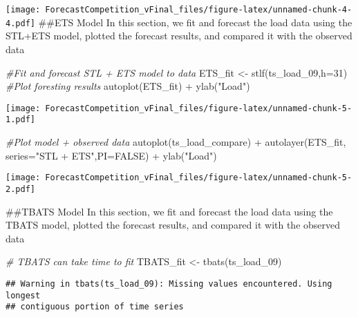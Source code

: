 \documentclass[
]{article}
\newenvironment{Shaded}{\begin{snugshade}}{\end{snugshade}}
\newcommand{\AttributeTok}[1]{\textcolor[rgb]{0.77,0.63,0.00}{#1}}
\newcommand{\CommentTok}[1]{\textcolor[rgb]{0.56,0.35,0.01}{\textit{#1}}}
\newcommand{\ConstantTok}[1]{\textcolor[rgb]{0.00,0.00,0.00}{#1}}
\newcommand{\DecValTok}[1]{\textcolor[rgb]{0.00,0.00,0.81}{#1}}
\newcommand{\FunctionTok}[1]{\textcolor[rgb]{0.00,0.00,0.00}{#1}}
\newcommand{\NormalTok}[1]{#1}
\newcommand{\OtherTok}[1]{\textcolor[rgb]{0.56,0.35,0.01}{#1}}
\newcommand{\SpecialCharTok}[1]{\textcolor[rgb]{0.00,0.00,0.00}{#1}}
\newcommand{\StringTok}[1]{\textcolor[rgb]{0.31,0.60,0.02}{#1}}
\begin{document}
\texttt{[image: ForecastCompetition\_vFinal\_files/figure-latex/unnamed-chunk-4-4.pdf]}
\#\#ETS Model In this section, we fit and forecast the load data using
the STL+ETS model, plotted the forecast results, and compared it with
the observed data

\begin{Shaded}
\begin{Highlighting}[]
\CommentTok{\#Fit and forecast STL + ETS model to data}
\NormalTok{ETS\_fit }\OtherTok{\textless{}{-}}  \FunctionTok{stlf}\NormalTok{(ts\_load\_09,}\AttributeTok{h=}\DecValTok{31}\NormalTok{)}
\CommentTok{\#Plot foresting results}
\FunctionTok{autoplot}\NormalTok{(ETS\_fit) }\SpecialCharTok{+} \FunctionTok{ylab}\NormalTok{(}\StringTok{"Load"}\NormalTok{)}
\end{Highlighting}
\end{Shaded}

\texttt{[image: ForecastCompetition\_vFinal\_files/figure-latex/unnamed-chunk-5-1.pdf]}

\begin{Shaded}
\begin{Highlighting}[]
\CommentTok{\#Plot model + observed data}
\FunctionTok{autoplot}\NormalTok{(ts\_load\_compare) }\SpecialCharTok{+}
  \FunctionTok{autolayer}\NormalTok{(ETS\_fit, }\AttributeTok{series=}\StringTok{"STL + ETS"}\NormalTok{,}\AttributeTok{PI=}\ConstantTok{FALSE}\NormalTok{) }\SpecialCharTok{+}
  \FunctionTok{ylab}\NormalTok{(}\StringTok{"Load"}\NormalTok{)}
\end{Highlighting}
\end{Shaded}

\texttt{[image: ForecastCompetition\_vFinal\_files/figure-latex/unnamed-chunk-5-2.pdf]}

\#\#TBATS Model In this section, we fit and forecast the load data using
the TBATS model, plotted the forecast results, and compared it with the
observed data

\begin{Shaded}
\begin{Highlighting}[]
\CommentTok{\# TBATS can take time to fit}
\NormalTok{TBATS\_fit }\OtherTok{\textless{}{-}} \FunctionTok{tbats}\NormalTok{(ts\_load\_09)}
\end{Highlighting}
\end{Shaded}

\begin{verbatim}
## Warning in tbats(ts_load_09): Missing values encountered. Using longest
## contiguous portion of time series
\end{verbatim}
\end{document}
